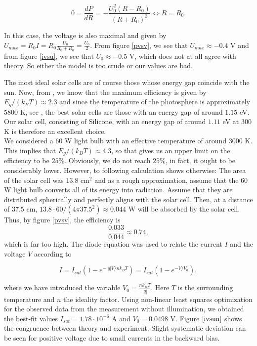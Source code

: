 \documentclass[12pt,a4paper]{article}
\begin{document}
\begin{displaymath}
  0=\frac{dP}{dR}=-\frac{U_0^2(R-R_0)}{(R+R_0)^3}\iff R=R_0.
\end{displaymath}

In this case, the voltage is also maximal and given by $U_{max}=R_0I=R_0\frac{U_0}{R_0+R_0}=\frac{U_0}{2}$.
From figure \ref{pvsv}, we see that $U_{max}\approx -0.4$ V and from figure \ref{ivsu}, we see that $U_0\approx -0.5$ V, which does not at all agree with theory. So either the model is too crude or our values are bad.

The most ideal solar cells are of course those whose energy gap coincide with the sun. Now, from \cite{lab_PM}, we know that the maximum efficiency is given by $E_g/(k_BT)\approx 2.3$ and since the temperature of the photosphere is approximately $5800$ K, see \cite{sun}, the best solar cells are those with an energy gap of around $1.15$ eV.
Our solar cell, consisting of Silicone, with an energy gap of around $1.11$ eV at $300$ K is therefore an excellent choice. \\

We considered a $60$ W light bulb with an effective temperature of around $3000$ K. This implies that $E_g/(k_B T)\approx 4.3$, so that \cite{lab_PM} gives us an upper limit on the efficiency to be $25$\%.
Obviously, we do not reach $25$\%, in fact, it ought to be considerably lower. However, to following calculation shows otherwise:
The area of the solar cell was $13.8$ cm${}^2$ and as a rough approximation, assume that the $60$ W light bulb converts all of its energy into radiation. Assume that they are distributed spherically and perfectly aligns with the solar cell. Then, at a distance of $37.5$ cm, $13.8\cdot 60/(4\pi 37.5^2)\approx 0.044$ W will be absorbed by the solar cell.
Thus, by figure \ref{pvsv}, the efficiency is
\begin{displaymath}
  \frac{0.033}{0.044}\approx 0.74,
\end{displaymath}
which is far too high.
The diode equation was used to relate the current $I$ and the voltage $V$ according to

$$I = I_{sat}\left(1-e^{-|q|V/nk_BT}\right) = I_{sat}\left(1-e^{-V/V_0}\right),$$

where we have introduced the variable $V_0 = \frac{nk_BT}{|q|}$. Here $T$ is the surrounding temperature and $n$ the ideality factor. Using non-linear least squares optimization for the observed data from the measurement without illumination, we obtained the best-fit values $I_{sat}=1.78\cdot 10^{-6}$ A and $V_0=0.0498$ V. Figure $\ref{ivsun}$ shows the congruence between theory and experiment. Slight systematic deviation can be seen for positive voltage due to small currents in the backward bias. \\
\end{document}
